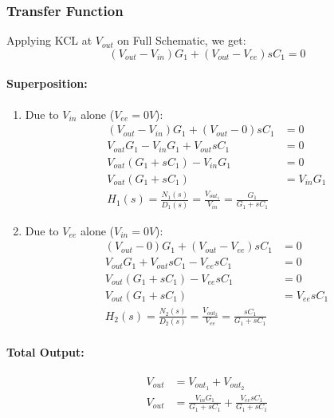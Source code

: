 \subsubsection{Transfer Function}
Applying KCL at $V_{out}$ on Full Schematic, we get:
\[
  (V_{out} - V_{in}){G_1} + (V_{out} - V_{ee}){sC_1} = 0
\]
\paragraph{Superposition:}
\begin{enumerate}
  \item Due to \(V_{in}\) alone (\(V_{ee} = 0V\)):
    \begin{align*}
      (V_{out} - V_{in}){G_1} + (V_{out} - 0){sC_1} &= 0 \\
      V_{out}G_1 - V_{in}G_1 + V_{out}sC_1 &= 0 \\
      V_{out}(G_1 + sC_1) - V_{in}G_1 &= 0 \\
      V_{out}(G_1 + sC_1) &= V_{in}G_1 \\
      \boxed{H_1(s) = \frac{N_1(s)}{D_1(s)} = \frac{V_{out_1}}{V_{in}} = \frac{G_1}{G_1 + sC_1}}
    \end{align*}
  \item Due to \(V_{ee}\) alone (\(V_{in} = 0V\)):
    \begin{align*}
      (V_{out} - 0){G_1} + (V_{out} - V_{ee}){sC_1} &= 0 \\
      V_{out}G_1 + V_{out}sC_1 - V_{ee}sC_1 &= 0 \\
      V_{out}(G_1 + sC_1) - V_{ee}sC_1 &= 0 \\
      V_{out}(G_1 + sC_1) &= V_{ee}sC_1 \\
      \boxed{H_2(s) = \frac{N_2(s)}{D_2(s)} = \frac{V_{out_2}}{V_{ee}} = \frac{sC_1}{G_1 + sC_1}}
    \end{align*}
\end{enumerate}

\paragraph{Total Output:}
\begin{align*}
  V_{out} &= V_{out_1} + V_{out_2} \\
  V_{out} &= \frac{V_{in}G_1}{G_1 + sC_1} + \frac{V_{ee}sC_1}{G_1 + sC_1}
\end{align*}

